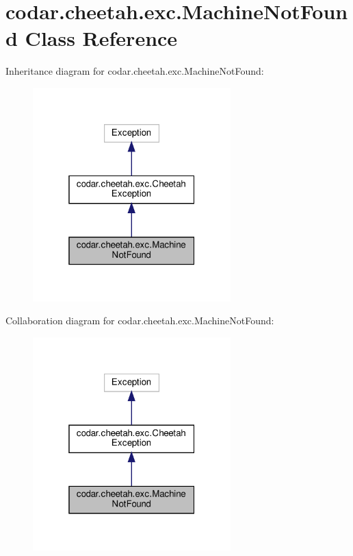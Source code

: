 \hypertarget{classcodar_1_1cheetah_1_1exc_1_1_machine_not_found}{}\section{codar.\+cheetah.\+exc.\+Machine\+Not\+Found Class Reference}
\label{classcodar_1_1cheetah_1_1exc_1_1_machine_not_found}


Inheritance diagram for codar.\+cheetah.\+exc.\+Machine\+Not\+Found\+:
\nopagebreak
\begin{figure}[H]
\begin{center}
\leavevmode
\includegraphics[width=217pt]{classcodar_1_1cheetah_1_1exc_1_1_machine_not_found__inherit__graph}
\end{center}
\end{figure}


Collaboration diagram for codar.\+cheetah.\+exc.\+Machine\+Not\+Found\+:
\nopagebreak
\begin{figure}[H]
\begin{center}
\leavevmode
\includegraphics[width=217pt]{classcodar_1_1cheetah_1_1exc_1_1_machine_not_found__coll__graph}
\end{center}
\end{figure}
